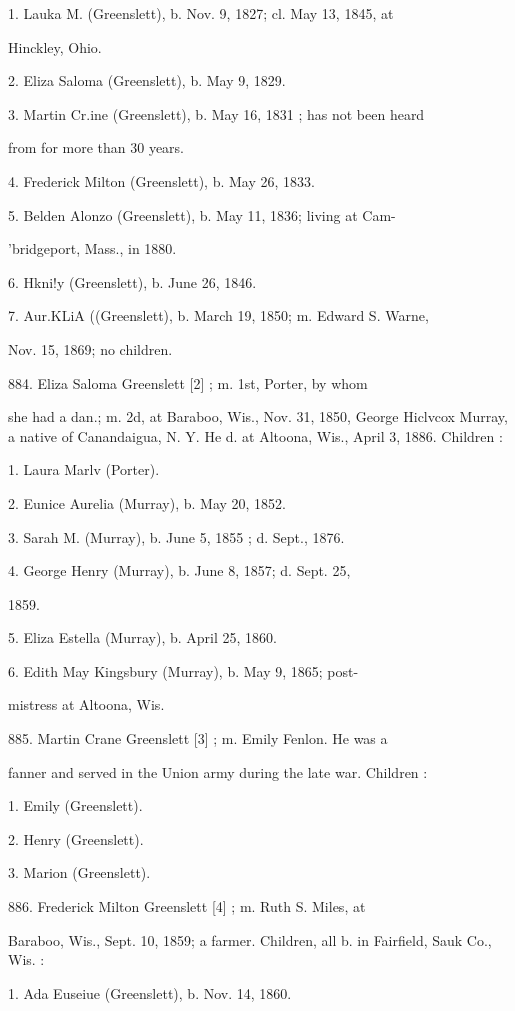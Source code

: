 1. Lauka M. (Greenslett), b. Nov. 9, 1827; cl. May 13, 1845, at 

Hinckley, Ohio. 

2. Eliza Saloma (Greenslett), b. May 9, 1829. 

3. Martin Cr.ine (Greenslett), b. May 16, 1831 ; has not been heard 

from for more than 30 years. 

4. Frederick Milton (Greenslett), b. May 26, 1833. 

5. Belden Alonzo (Greenslett), b. May 11, 1836; living at Cam- 

'bridgeport, Mass., in 1880. 

6. Hkni!y (Greenslett), b. June 26, 1846. 

7. Aur.KLiA ((Greenslett), b. March 19, 1850; m. Edward S. Warne, 

Nov. 15, 1869; no children. 

884. Eliza Saloma Greenslett [2] ; m. 1st, Porter, by whom 

she had a dan.; m. 2d, at Baraboo, Wis., Nov. 31, 1850, 
George Hiclvcox Murray, a native of Canandaigua, N. Y. He 
d. at Altoona, Wis., April 3, 1886. Children : 

1. Laura Marlv (Porter). 

2. Eunice Aurelia (Murray), b. May 20, 1852. 

3. Sarah M. (Murray), b. June 5, 1855 ; d. Sept., 1876. 

4. George Henry (Murray), b. June 8, 1857; d. Sept. 25, 

1859. 

5. Eliza Estella (Murray), b. April 25, 1860. 

6. Edith May Kingsbury (Murray), b. May 9, 1865; post- 

mistress at Altoona, Wis. 

885. Martin Crane Greenslett [3] ; m. Emily Fenlon. He was a 

fanner and served in the Union army during the late war. 
Children : 

1. Emily (Greenslett). 

2. Henry (Greenslett). 

3. Marion (Greenslett). 

886. Frederick Milton Greenslett [4] ; m. Ruth S. Miles, at 

Baraboo, Wis., Sept. 10, 1859; a farmer. Children, all b. in 
Fairfield, Sauk Co., Wis. : 

1. Ada Euseiue (Greenslett), b. Nov. 14, 1860. 

